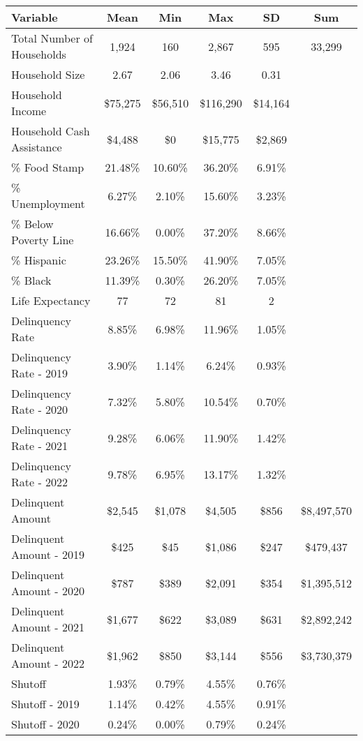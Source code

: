 \begin{tabular}{l|c|c|c|c|c}
\toprule 
\midrule 
Variable & Mean & Min & Max & SD & Sum \\
\midrule 
Total Number of Households & 1,924 & 160 & 2,867 & 595 & 33,299 \\
\quad Household Size & 2.67 & 2.06 & 3.46 & 0.31 \\
Household Income & \$75,275 & \$56,510 & \$116,290 & \$14,164 \\
\quad Household Cash Assistance & \$4,488 & \$0 & \$15,775 & \$2,869 \\
\% Food Stamp & 21.48\% & 10.60\% & 36.20\% & 6.91\% \\
\% Unemployment & 6.27\% & 2.10\% & 15.60\% & 3.23\% \\
\% Below Poverty Line & 16.66\% & 0.00\% & 37.20\% & 8.66\% \\
\% Hispanic & 23.26\% & 15.50\% & 41.90\% & 7.05\% \\
\% Black & 11.39\% & 0.30\% & 26.20\% & 7.05\% \\
Life Expectancy & 77 & 72 & 81 & 2 \\
\midrule 
Delinquency Rate & 8.85\% & 6.98\% & 11.96\% & 1.05\% \\
\quad Delinquency Rate - 2019 & 3.90\% & 1.14\% & 6.24\% & 0.93\% \\
\quad Delinquency Rate - 2020 & 7.32\% & 5.80\% & 10.54\% & 0.70\% \\
\quad Delinquency Rate - 2021 & 9.28\% & 6.06\% & 11.90\% & 1.42\% \\
\quad Delinquency Rate - 2022 & 9.78\% & 6.95\% & 13.17\% & 1.32\% \\
\midrule 
Delinquent Amount & \$2,545 & \$1,078 & \$4,505 & \$856 & \$8,497,570 \\
\quad Delinquent Amount - 2019 & \$425 & \$45 & \$1,086 & \$247 & \$479,437 \\
\quad Delinquent Amount - 2020 & \$787 & \$389 & \$2,091 & \$354 & \$1,395,512 \\
\quad Delinquent Amount - 2021 & \$1,677 & \$622 & \$3,089 & \$631 & \$2,892,242 \\
\quad Delinquent Amount - 2022 & \$1,962 & \$850 & \$3,144 & \$556 & \$3,730,379 \\
\midrule 
Shutoff & 1.93\% & 0.79\% & 4.55\% & 0.76\% \\
\quad Shutoff - 2019 & 1.14\% & 0.42\% & 4.55\% & 0.91\% \\
\quad Shutoff - 2020 & 0.24\% & 0.00\% & 0.79\% & 0.24\% \\

\end{tabular}

